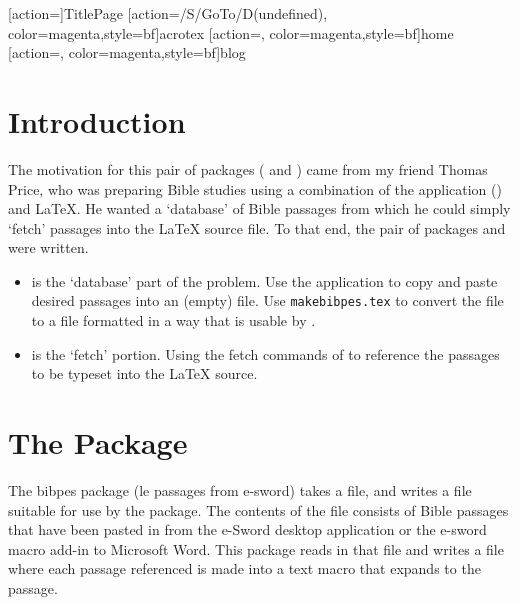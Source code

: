 \documentclass{article}
\begin{document}
\maketitle

[action={}]{TitlePage}
[action={/S/GoTo/D(undefined)},%
  color=magenta,style={bf}]{acrotex}
[action={},%
  color=magenta,style={bf}]{home}
[action={},%
  color=magenta,style={bf}]{blog}


\tableofcontents
{}


\section{Introduction}

The motivation for this pair of packages ( and )
came from my friend Thomas Price, who was preparing Bible studies using a
combination of the application 
() and \LaTeX. He wanted a `database' of Bible
passages from which he could simply `fetch' passages into the {\LaTeX} source
file. To that end, the pair of packages  and 
were written.
\begin{itemize}
    \item {} is the `database' part of the problem. Use the
         application to copy and paste desired passages into
        an (empty)  file. Use \texttt{makebibpes.tex} to convert the
         file to a  file formatted in a way that
        is usable by .

    \item {} is the `fetch' portion. Using the fetch
        commands of  to reference the passages to be
        typeset into the {\LaTeX} source.
\end{itemize}

\section{The \texorpdfstring{\protect{}}{bibpes} Package}

    The \textsf{bibpes} package (le
    \underbar passages from \underbar e-\underbar sword) takes a  file,
    and writes a  file suitable for use by the 
    package. The contents of the  file consists of Bible passages that
    have been pasted in from the \textsf{e-Sword} desktop application or the
    \textsf{e-sword} macro add-in to \textsf{Microsoft Word}. This package reads in
    that  file and writes a  file where each passage referenced
    is made into a text macro that expands to the passage.
\end{document}
